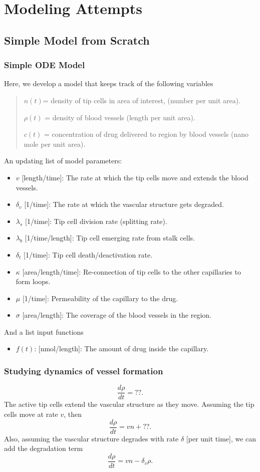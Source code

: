 \chapter{Modeling Attempts}

\section{Simple Model from Scratch}
\subsection{Simple ODE Model}
Here, we develop a model that keeps track of the following variables
\begin{quote}
	$n(t)$= density of tip cells in area of interest, (number per unit area).
	
	$\rho(t)$ = density of blood vessels (length per unit area).
	
	$c(t)$ = concentration of drug delivered to region by blood vessels (nano mole per unit area).
\end{quote}
An updating list of model parameters:
\begin{itemize}
	\item $v$ [length/time]: The rate at which the tip cells move and extends the blood vessels.
	\item $\delta_v$ [1/time]: The rate at which the vascular structure gets degraded.
	\item $\lambda_s$ [1/time]: Tip cell division rate (splitting rate).
	\item $\lambda_b$ [1/time/length]: Tip cell emerging rate from stalk cells.
	\item $\delta_t$ [1/time]: Tip cell death/deactivation rate.
	\item $\kappa$ [area/length/time]: Re-connection of tip cells to the other capillaries to form loops.  
	\item $\mu$ [1/time]: Permeability of the capillary to the drug. 
	\item $\sigma$ [area/length]: The coverage of the blood vessels in the region.
\end{itemize}
And a list input functions
\begin{itemize}
	\item $f(t)$: [nmol/length]: The amount of drug inside the capillary.
\end{itemize}




\subsection*{Studying dynamics of vessel formation}
\[ \frac{d\rho}{dt} = ??. \]
The active tip cells extend the vascular structure as they move. Assuming the tip cells move at rate $v$, then 
\[ \frac{d \rho}{dt} = vn+ ??. \]
Also, assuming the vascular structure degrades with rate $\delta$ [per unit time], we can add the degradation term 
\[ \boxed{\frac{d\rho}{dt} = vn - \delta_v \rho} . \]



